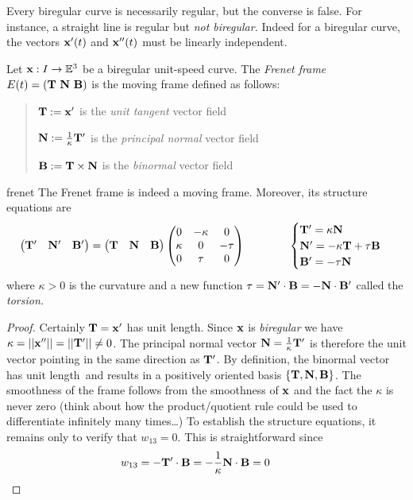 Every biregular curve is necessarily regular, but the converse is false. For instance, a straight line is regular but \emph{not biregular.} Indeed for a biregular curve, the vectors ${\mathbf{x}}'(t)$ and ${\mathbf{x}}''(t)$ must be linearly independent.

\begin{defn}{}{}
Let ${\mathbf{x}}:I\to\mathbb{E}^3$ be a biregular unit-speed curve. The \emph{Frenet frame} $E(t)=({\mathbf{T}}\ {\mathbf{N}}\ {\mathbf{B}})$ is the moving frame defined as follows:
\begin{quote}
	${\mathbf{T}}:={\mathbf{x}}'$ is the \emph{unit tangent} vector field\par
	${\mathbf{N}}:=\frac 1{\kappa}{\mathbf{T}}'$ is the \emph{principal normal} vector field\par
	${\mathbf{B}}:={\mathbf{T}}\times{\mathbf{N}}$ is the \emph{binormal} vector field
\end{quote}
\end{defn}


\begin{thm}{}{frenet}
The Frenet frame is indeed a moving frame. Moreover, its structure equations are
\[\begin{pmatrix}
		{\mathbf{T}}'&{\mathbf{N}}'&{\mathbf{B}}'
  \end{pmatrix}
  =
  \begin{pmatrix}
  	{\mathbf{T}}&{\mathbf{N}}&{\mathbf{B}}
  \end{pmatrix}
  \begin{pmatrix}
		0&-\kappa&0\\
		\kappa&0&-\tau\\
		0&\tau&0
	\end{pmatrix}
	\qquad\qquad 
	\begin{cases}
		{\mathbf{T}}'=\kappa{\mathbf{N}}\\
		{\mathbf{N}}'=-\kappa{\mathbf{T}}+\tau{\mathbf{B}}\\
		{\mathbf{B}}'=-\tau{\mathbf{N}}
	\end{cases}
  \]
where $\kappa>0$ is the curvature and a new function $\tau={\mathbf{N}}'\cdot{\mathbf{B}}=-{\mathbf{N}}\cdot{\mathbf{B}}'$ called the \emph{torsion.}
\end{thm}

\begin{proof}
Certainly ${\mathbf{T}}={\mathbf{x}}'$ has unit length.\smallbreak
Since ${\mathbf{x}}$ is \emph{biregular} we have $\kappa=\left| \left| {\mathbf{x}}''\right|\right|=\left| \left| {\mathbf{T}}'\right|\right|\neq 0$. The principal normal vector ${\mathbf{N}}=\frac 1\kappa{\mathbf{T}}'$ is therefore the unit vector pointing in the same direction as ${\mathbf{T}}'$.\smallbreak
By definition, the binormal vector has unit length\footnotemark\ and results in a positively oriented basis $\{{\mathbf{T}},{\mathbf{N}},{\mathbf{B}}\}$.\smallbreak
The smoothness of the frame follows from the smoothness of ${\mathbf{x}}$ and the fact the $\kappa$ is never zero (think about how the product/quotient rule could be used to differentiate infinitely many times\ldots)\smallbreak
To establish the structure equations, it remains only to verify that $w_{13}=0$. This is straightforward since
\[w_{13}=-{\mathbf{T}}'\cdot{\mathbf{B}}=-\frac 1\kappa{\mathbf{N}}\cdot{\mathbf{B}}=0\tag*{\qedhere}\]
\end{proof}


